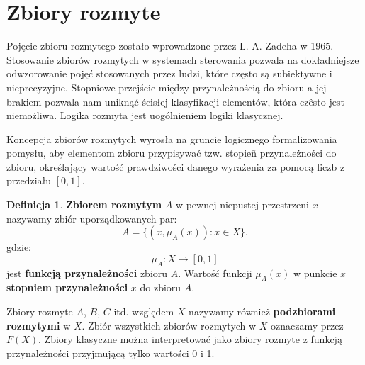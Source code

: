 \documentclass[a4paper,12pt]{article}
\theoremstyle{definition}
\newtheorem{df}{Definicja}
\begin{document}

\section{Zbiory rozmyte}

Pojęcie zbioru rozmytego zostało wprowadzone przez L. A. Zadeha w 1965. Stosowanie zbiorów rozmytych w systemach sterowania pozwala na dokładniejsze odwzorowanie pojęć stosowanych przez ludzi, które często są subiektywne i nieprecyzyjne. Stopniowe przejście między przynależnością do zbioru a jej brakiem pozwala nam uniknąć ścisłej klasyfikacji elementów, która czêsto jest niemożliwa. Logika rozmyta jest uogólnieniem logiki klasycznej. 

Koncepcja zbiorów rozmytych wyrosła na gruncie logicznego formalizowania pomysłu, aby elementom zbioru przypisywać tzw. stopieñ przynależności do zbioru, określający wartość prawdziwości danego wyrażenia za pomocą liczb z przedziału $[0,1]$. 

\begin{df}
\textbf{Zbiorem rozmytym} $A$ w pewnej niepustej przestrzeni $x$ nazywamy zbiór uporządkowanych par:
\begin{equation}
A=\{(x,\mu_{A}(x))\colon x\in X\}.
\end{equation}
gdzie:
\begin{equation}
\mu_{A}\colon X\rightarrow [0,1]
\end{equation}
jest \textbf{funkcją przynależności} zbioru $A$.
Wartość funkcji $\mu_{A}(x)$ w punkcie $x$ \textbf{stopniem przynależności} $x$ do zbioru $A$.
\end{df}


Zbiory rozmyte $A$, $B$, $C$ itd. względem $X$ nazywamy również \textbf{podzbiorami rozmytymi} w $X$.
Zbiór wszystkich zbiorów rozmytych w $X$ oznaczamy przez $F(X)$. Zbiory klasyczne można interpretować jako zbiory rozmyte z funkcją przynależności przyjmującą tylko wartości 0 i 1.
\end{document}
